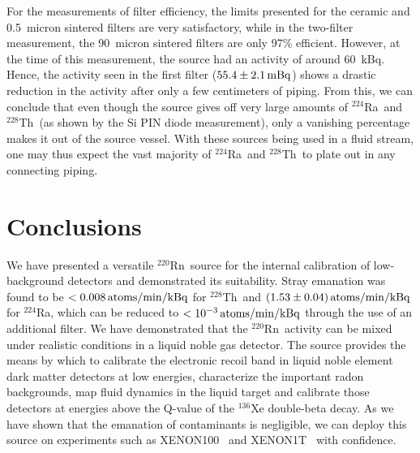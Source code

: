 For the measurements of filter efficiency, the limits presented for the ceramic and 0.5~micron sintered filters are very satisfactory, while in the two-filter measurement, the 90~micron sintered filters are only 97\% efficient. However, at the time of this measurement, the source had an activity of around 60~kBq. Hence, the activity seen in the first filter ($55.4\pm2.1\,\mathrm{mBq}$) shows a drastic reduction in the activity after only a few centimeters of piping. From this, we can conclude that even though the source gives off very large amounts of $^{224}$Ra~and $^{228}$Th~(as shown by the Si PIN diode measurement), only a vanishing percentage makes it out of the source vessel. With these sources being used in a fluid stream, one may thus expect the vast majority of $^{224}$Ra~and $^{228}$Th~to plate out in any connecting piping.

\section{Conclusions}

We have presented a versatile $^{220}$Rn~source for the internal calibration of low-background detectors and demonstrated its suitability. Stray emanation was found to be $<0.008\,\mathrm{atoms/min/kBq}$ for $^{228}$Th~and $(1.53\pm0.04)\,\mathrm{atoms/min/kBq}$ for $^{224}$Ra, which can be reduced to $<10^{-3}\,\mathrm{atoms/min/kBq}$ through the use of an additional filter. We have demonstrated that the $^{220}$Rn~activity can be mixed under realistic conditions in a liquid noble gas detector. The source provides the means by which to calibrate the electronic recoil band in liquid noble element dark matter detectors at low energies, characterize the important radon backgrounds, map fluid dynamics in the liquid target and calibrate those detectors at energies above the Q-value of the $^{136}$Xe double-beta decay. As we have shown that the emanation of contaminants is negligible, we can deploy this source on experiments such as XENON100~\cite{Aprile:2016pmc} and XENON1T~\cite{Aprile:2017iyp} with confidence.